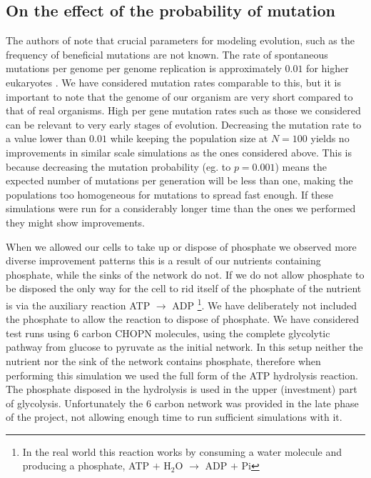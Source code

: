 \documentclass[a4paper,12pt]{article}
\begin{document}
\subsection{On the effect of the probability of mutation}
\label{sub:on_the_effect_of_the_probability_of_mutation}


The authors of \cite{predictability} note that crucial parameters for modeling evolution, such as the frequency of beneficial mutations are not known. The rate of spontaneous mutations per genome per genome replication is approximately $0.01$ for higher eukaryotes \cite{mutationrate}. We have considered mutation rates comparable to this, but it is important to note that the genome of our organism are very short compared to that of real organisms. High per gene mutation rates such as those we considered can be relevant to very early stages of evolution. Decreasing the mutation rate to a value lower than $0.01$ while keeping the population size at $N=100$ yields no improvements in similar scale simulations as the ones considered above. This is because decreasing the mutation probability (eg. to $p=0.001$) means the expected number of mutations per generation will be less than one, making the populations too homogeneous for mutations to spread fast enough. If these simulations were run for a considerably longer time than the ones we performed they might show improvements. 


When we allowed our cells to take up or dispose of phosphate we observed more diverse improvement patterns this is a result of our nutrients containing phosphate, while the sinks of the network do not. If we do not allow phosphate to be disposed the only way for the cell to rid itself of the phosphate of the nutrient is via the auxiliary reaction ATP $\rightarrow$ ADP \footnote{In the real world this reaction works by consuming a water molecule and producing a phosphate, ATP $+$ H$_2$O $\rightarrow$ ADP $+$ Pi}. We have deliberately not included the phosphate to allow the reaction to dispose of phosphate. We have considered test runs using  $6$ carbon CHOPN molecules, using the complete glycolytic pathway from glucose to pyruvate as the initial network. In this setup neither the nutrient nor the sink of the network contains phosphate, therefore when performing this simulation we used the full form of the ATP hydrolysis reaction. The phosphate disposed in the hydrolysis is used in the upper (investment) part of glycolysis. Unfortunately the $6$ carbon network was provided in the late phase of the project, not allowing enough time to run sufficient simulations with it. 
\end{document}
